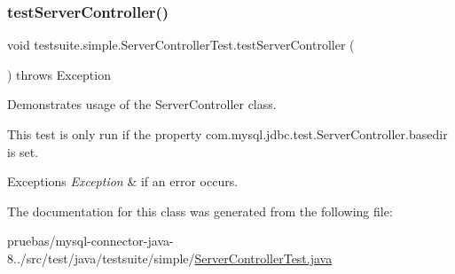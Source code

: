 \subsubsection{\texorpdfstring{test\+Server\+Controller()}{testServerController()}}
{\footnotesize\ttfamily void testsuite.\+simple.\+Server\+Controller\+Test.\+test\+Server\+Controller (\begin{DoxyParamCaption}{ }\end{DoxyParamCaption}) throws Exception}

Demonstrates usage of the Server\+Controller class.

This test is only run if the property \textquotesingle{}com.\+mysql.\+jdbc.\+test.\+Server\+Controller.\+basedir\textquotesingle{} is set.


\begin{DoxyExceptions}{Exceptions}
{\em Exception} & if an error occurs. \\
\hline
\end{DoxyExceptions}


The documentation for this class was generated from the following file\+:\begin{DoxyCompactItemize}
\item 
pruebas/mysql-\/connector-\/java-\/8../src/test/java/testsuite/simple/\mbox{\hyperlink{_server_controller_test_8java}{Server\+Controller\+Test.\+java}}\end{DoxyCompactItemize}
